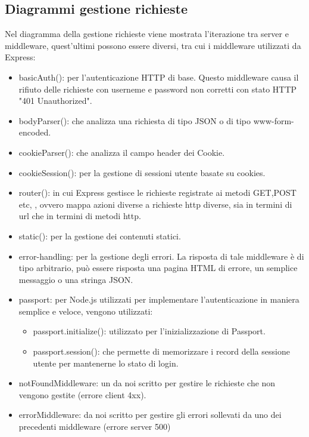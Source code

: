 \subsection{Diagrammi gestione richieste}
Nel diagramma della gestione richieste viene mostrata l'iterazione tra server e middleware, quest'ultimi possono essere diversi, tra cui i middleware utilizzati da Express:
\begin{itemize}
\item{basicAuth()}:  per l'autenticazione HTTP di base. Questo middleware causa il rifiuto delle richieste con userneme e password non corretti con stato HTTP "401 Unauthorized".
\item{bodyParser()}:  che analizza una richiesta di tipo JSON o di tipo www-form-encoded.
\item{cookieParser()}:  che analizza il campo header dei Cookie.
\item{cookieSession()}:  per la gestione di sessioni utente basate su cookies.
\item{router()}:  in cui Express gestisce le richieste registrate ai metodi GET,POST etc, , ovvero mappa azioni diverse a richieste http diverse, sia in termini di url che in termini di metodi http.
\item{static()}:  per la gestione dei contenuti statici.
\item{error-handling}:  per la gestione degli errori. La risposta di tale middleware è di tipo arbitrario, può essere risposta una pagina HTML di errore, un semplice messaggio o una stringa JSON.
\item{passport}:  per Node.js utilizzati per implementare l'autenticazione in maniera semplice e veloce,
vengono utilizzati:
	\begin{itemize}
	\item{passport.initialize()}:  utilizzato per l'inizializzazione di Passport.
	\item{passport.session()}:   che permette di memorizzare i record della sessione utente per mantenerne lo stato di login. 
	\end{itemize}
\item{notFoundMiddleware}: un  da noi scritto per gestire le richieste che non vengono gestite (errore client 4xx).
\item{errorMiddleware}:  da noi scritto per gestire gli errori sollevati da uno dei precedenti middleware (errore server 500)
\end{itemize}
